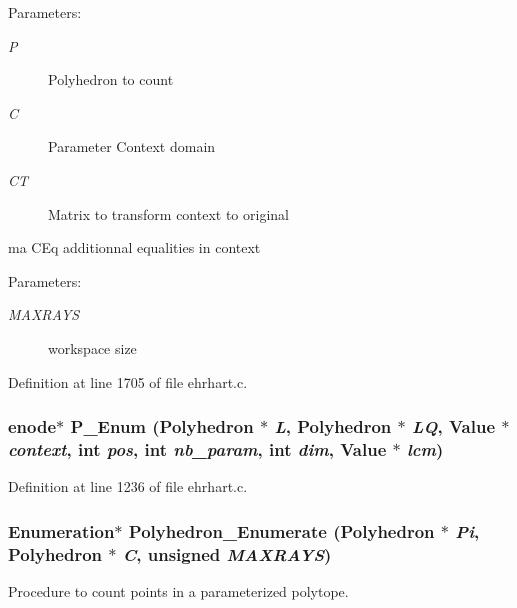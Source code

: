 \begin{Desc}
\item[Parameters: ]\par
\begin{description}
\item[{\em 
P}]Polyhedron to count \item[{\em 
C}]Parameter Context domain \item[{\em 
CT}]Matrix to transform context to original \end{description}
\end{Desc}
\begin{Desc}
\item[ma CEq     additionnal equalities in context]\par
\end{Desc}
\begin{Desc}
\item[Parameters: ]\par
\begin{description}
\item[{\em 
MAXRAYS}]workspace size \end{description}
\end{Desc}


Definition at line 1705 of file ehrhart.c.
\subsubsection{\setlength{\rightskip}{0pt plus 5cm}enode$\ast$ P\_\-Enum (Polyhedron $\ast$ {\em L}, Polyhedron $\ast$ {\em LQ}, Value $\ast$ {\em context}, int {\em pos}, int {\em nb\_\-param}, int {\em dim}, Value $\ast$ {\em lcm})\hspace{0.3cm}{\tt  [static]}}\label{ehrhart_8c_a24}




Definition at line 1236 of file ehrhart.c.
\subsubsection{\setlength{\rightskip}{0pt plus 5cm}Enumeration$\ast$ Polyhedron\_\-Enumerate (Polyhedron $\ast$ {\em Pi}, Polyhedron $\ast$ {\em C}, unsigned {\em MAXRAYS})}\label{ehrhart_8c_a27}


Procedure to count points in a parameterized polytope.

